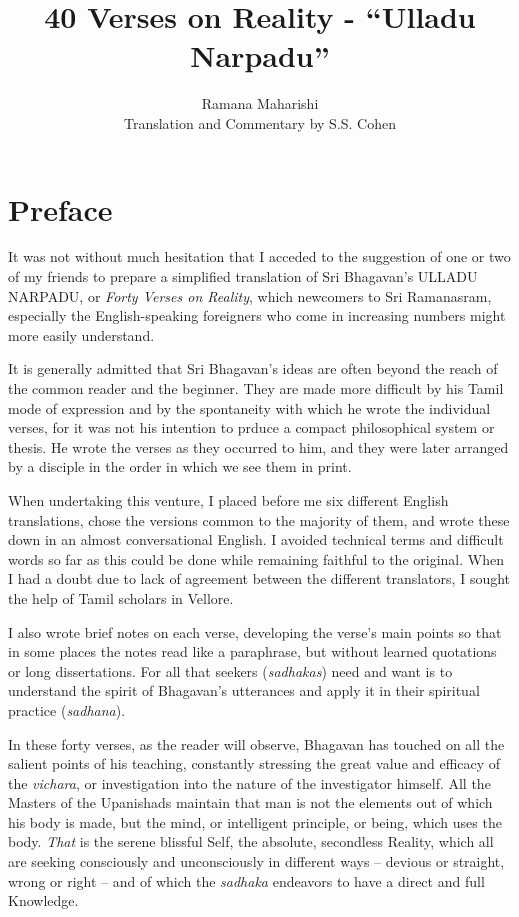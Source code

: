 \documentclass[12pt]{report}
\begin{document}
\title{40 Verses on Reality - ``Ulladu Narpadu''}
\author{Ramana Maharishi \\ Translation and Commentary by S.S. Cohen}
\maketitle


\tableofcontents

\chapter{Preface}

It was not without much hesitation that I acceded to the suggestion of
one or two of my friends to prepare a simplified translation of Sri
Bhagavan's ULLADU NARPADU, or \emph{Forty Verses on Reality}, which
newcomers to Sri Ramanasram, especially the English-speaking
foreigners who come in increasing numbers might more easily
understand.

It is generally admitted that Sri Bhagavan's ideas are often beyond
the reach of the common reader and the beginner. They are made more
difficult by his Tamil mode of expression and by the spontaneity with
which he wrote the individual verses, for it was not his intention to
prduce a compact philosophical system or thesis. He wrote the verses
as they occurred to him, and they were later arranged by a disciple in
the order in which we see them in print.

When undertaking this venture, I placed before me six different
English translations, chose the versions common to the majority of
them, and wrote these down in an almost conversational English. I
avoided technical terms and difficult words so far as this could be
done while remaining faithful to the original. When I had a doubt due
to lack of agreement between the different translators, I sought the
help of Tamil scholars in Vellore.

I also wrote brief notes on each verse, developing the verse's main
points so that in some places the notes read like a paraphrase, but
without learned quotations or long dissertations. For all that seekers
(\emph{sadhakas}) need and want is to understand the spirit of
Bhagavan's utterances and apply it in their spiritual practice
(\emph{sadhana}).

In these forty verses, as the reader will observe, Bhagavan has
touched on all the salient points of his teaching, constantly
stressing the great value and efficacy of the \emph{vichara}, or
investigation into the nature of the investigator himself. All the
Masters of the Upanishads maintain that man is not the elements out of
which his body is made, but the mind, or intelligent principle, or
being, which uses the body. \emph{That} is the serene blissful Self,
the absolute, secondless Reality, which all are seeking consciously
and unconsciously in different ways -- devious or straight, wrong or
right -- and of which the \emph{sadhaka} endeavors to have a direct
and full Knowledge.
\end{document}
